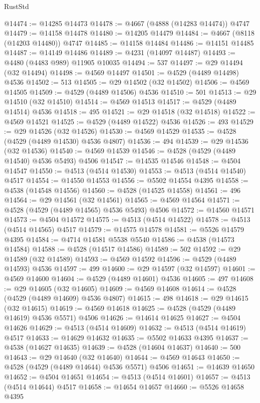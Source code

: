 \begin{lexlean}{RustStd}
\begin{coremodule}
@14474 := @14285 @14473
@14478 := @4667 (@4888 (@14283 @14474)) @4747
@14479 := @14158 @14478
@14480 := @14205 @14479
@14484 := @4667 (@8118 (@14203 @14480)) @4747
@14485 := @14158 @14484
@14486 := @14151 @14485
@14487 := @14149 @14486
@14489 := @4231 (@14097 @14487)
@14493 := @4480 (@4483 @989) @11905 @10035
@14494 := 537
@14497 := @29 @14494 (@32 @14494)
@14498 := @4569 @14497
@14501 := @4529 (@4489 @14498) @4536
@14502 := 513
@14505 := @29 @14502 (@32 @14502)
@14506 := @4569 @14505
@14509 := @4529 (@4489 @14506) @4536
@14510 := 501
@14513 := @29 @14510 (@32 @14510)
@14514 := @4569 @14513
@14517 := @4529 (@4489 @14514) @4536
@14518 := 495
@14521 := @29 @14518 (@32 @14518)
@14522 := @4569 @14521
@14525 := @4529 (@4489 @14522) @4536
@14526 := 493
@14529 := @29 @14526 (@32 @14526)
@14530 := @4569 @14529
@14535 := @4528 (@4529 (@4489 @14530) @4536 @4807)
@14536 := 494
@14539 := @29 @14536 (@32 @14536)
@14540 := @4569 @14539
@14546 := @4528 (@4529 (@4489 @14540) @4536 @5493) @4506
@14547 := @14535 @14546
@14548 := @4504 @14547
@14550 := @4513 (@4514 @14530)
@14553 := @4513 (@4514 @14540) @4517
@14554 := @14550 @14553
@14556 := @5502 @14554 @4395
@14558 := @4538 (@14548 @14556)
@14560 := @4528 (@14525 @14558)
@14561 := 496
@14564 := @29 @14561 (@32 @14561)
@14565 := @4569 @14564
@14571 := @4528 (@4529 (@4489 @14565) @4536 @5493) @4506
@14572 := @14560 @14571
@14573 := @4504 @14572
@14575 := @4513 (@4514 @14522)
@14578 := @4513 (@4514 @14565) @4517
@14579 := @14575 @14578
@14581 := @5526 @14579 @4395
@14584 := @4714 @14581 @5538 @5540
@14586 := @4538 (@14573 @14584)
@14588 := @4528 (@14517 @14586)
@14589 := 502
@14592 := @29 @14589 (@32 @14589)
@14593 := @4569 @14592
@14596 := @4529 (@4489 @14593) @4536
@14597 := 499
@14600 := @29 @14597 (@32 @14597)
@14601 := @4569 @14600
@14604 := @4529 (@4489 @14601) @4536
@14605 := 497
@14608 := @29 @14605 (@32 @14605)
@14609 := @4569 @14608
@14614 := @4528 (@4529 (@4489 @14609) @4536 @4807)
@14615 := 498
@14618 := @29 @14615 (@32 @14615)
@14619 := @4569 @14618
@14625 := @4528 (@4529 (@4489 @14619) @4536 @5571) @4506
@14626 := @14614 @14625
@14627 := @4504 @14626
@14629 := @4513 (@4514 @14609)
@14632 := @4513 (@4514 @14619) @4517
@14633 := @14629 @14632
@14635 := @5502 @14633 @4395
@14637 := @4538 (@14627 @14635)
@14639 := @4528 (@14604 @14637)
@14640 := 500
@14643 := @29 @14640 (@32 @14640)
@14644 := @4569 @14643
@14650 := @4528 (@4529 (@4489 @14644) @4536 @5571) @4506
@14651 := @14639 @14650
@14652 := @4504 @14651
@14654 := @4513 (@4514 @14601)
@14657 := @4513 (@4514 @14644) @4517
@14658 := @14654 @14657
@14660 := @5526 @14658 @4395

\end{coremodule}
\end{lexlean}

